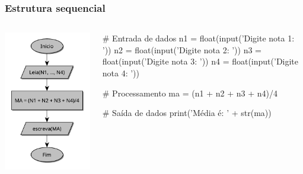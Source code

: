 \documentclass{beamer}
\begin{document}
\begin{frame}[fragile]
\frametitle{Estrutura sequencial}

\begin{columns}
	\begin{column}{0.5\textwidth}		
	\center \includegraphics[scale=0.4]{./figures/media_seq.pdf}
	\end{column}
	
	\begin{column}{0.5\textwidth}  %
\begin{python}
# Entrada de dados
n1 = float(input('Digite nota 1: '))
n2 = float(input('Digite nota 2: '))
n3 = float(input('Digite nota 3: '))
n4 = float(input('Digite nota 4: '))

# Processamento
ma = (n1 + n2 + n3 + n4)/4

# Saída de dados
print('Média é: ' + str(ma))
\end{python}  
\end{column}
\end{columns}
\end{frame}
\end{document}
